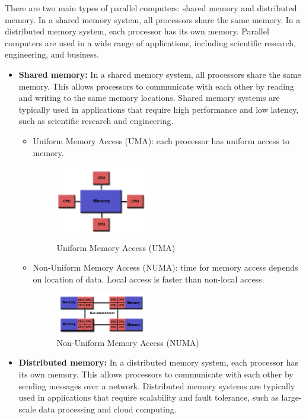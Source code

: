 \newpage 
There are two main types of parallel computers: shared memory and distributed memory. In a shared memory system, all processors share the same memory. In a distributed memory system, each processor has its own memory. Parallel computers are used in a wide range of applications, including scientific research, engineering, and business.
\begin{itemize}
    \item \textbf{Shared memory:} In a shared memory system, all processors share the same memory. This allows processors to communicate with each other by reading and writing to the same memory locations. Shared memory systems are typically used in applications that require high performance and low latency, such as scientific research and engineering.
        \begin{itemize}
            \item Uniform Memory Access (UMA): each processor has uniform access to memory.
            \begin{figure}[H]
                \centering
                \includegraphics[width=0.4\textwidth]{assets/fig18.png}
                \caption{Uniform Memory Access (UMA)}
            \end{figure}
            \item Non-Uniform Memory Access (NUMA): time for memory access depends on location of data. Local access is faster than non-local access. 
            \begin{figure}[H]
                \centering
                \includegraphics[width=0.4\textwidth]{assets/fig19.png}
                \caption{Non-Uniform Memory Access (NUMA)}
            \end{figure}
        \end{itemize}
    \item \textbf{Distributed memory:} In a distributed memory system, each processor has its own memory. This allows processors to communicate with each other by sending messages over a network. Distributed memory systems are typically used in applications that require scalability and fault tolerance, such as large-scale data processing and cloud computing.

\end{itemize}

